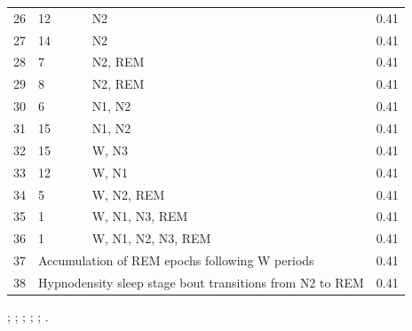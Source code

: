 \begin{table}[htbp]
\begin{threeparttable}
\begin{tabular}{@{}lp{6cm}lr@{}}
        26 & 12                                                     & \ac{N2}                               & 0.41                         \\
        27 & 14                                                     & \ac{N2}                               & 0.41                         \\
        28 & 7                                                      & \ac{N2}, \ac{REM}                     & 0.41                         \\
        29 & 8                                                      & \ac{N2}, \ac{REM}                     & 0.41                         \\
        30 & 6                                                      & \ac{N1}, \ac{N2}                      & 0.41                         \\
        31 & 15                                                     & \ac{N1}, \ac{N2}                      & 0.41                         \\
        32 & 15                                                     & \ac{W}, \ac{N3}                       & 0.41                         \\
        33 & 12                                                     & \ac{W}, \ac{N1}                       & 0.41                         \\
        34 & 5                                                      & \ac{W}, \ac{N2}, \ac{REM}             & 0.41                         \\
        35 & 1                                                      & \ac{W}, \ac{N1}, \ac{N3}, \ac{REM}    & 0.41                         \\
        36 & 1                                                      & \ac{W}, \ac{N1}, \ac{N2}, \ac{N3}, \ac{REM}   & 0.41                 \\
        37 & \multicolumn{2}{l}{Accumulation of \ac{REM} epochs following \ac{W} periods}                   & 0.41                         \\
        38 & \multicolumn{2}{l}{Hypnodensity sleep stage bout transitions from \ac{N2} to \ac{REM}}         & 0.41                         \\ \bottomrule
    \end{tabular}
    \begin{tablenotes}
    \item %
    ; %
    ; %
    ; %
    ; %
    ; %
    .
    \end{tablenotes}
    \end{threeparttable}
\end{table}

